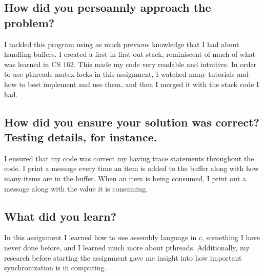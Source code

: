 \documentclass[letterpaper,onecolumn,10pt,titlepage]{IEEEtran}
\begin{document}
\subsection{How did you persoannly approach the problem?}
\par
I tackled this program using as much previous knowledge that I had about handling buffers. I created a first in first out stack, reminiscent of much of what was learned in CS 162. This made my code very readable and intuitive. In order to use pthreads mutex locks in this assignment, I watched many tutorials and how to best implement and use them, and then I merged it with the stack code I had. \\
\par
\subsection{How did you ensure your solution was correct? Testing details, for instance.}
\par
I ensured that my code was correct my having trace statements throughout the code. I print a message every time an item is added to the buffer along with how many items are in the buffer. When an item is being consumed, I print out a message along with the value it is consuming.\\
\par
\subsection{What did you learn?}
\par 
In this assignment I learned how to use assembly language in c, something I have never done before, and I learned much more about pthreads. Additionally, my research before starting the assignment gave me insight into how important synchronization is in computing.\\
\par

\end{document}
